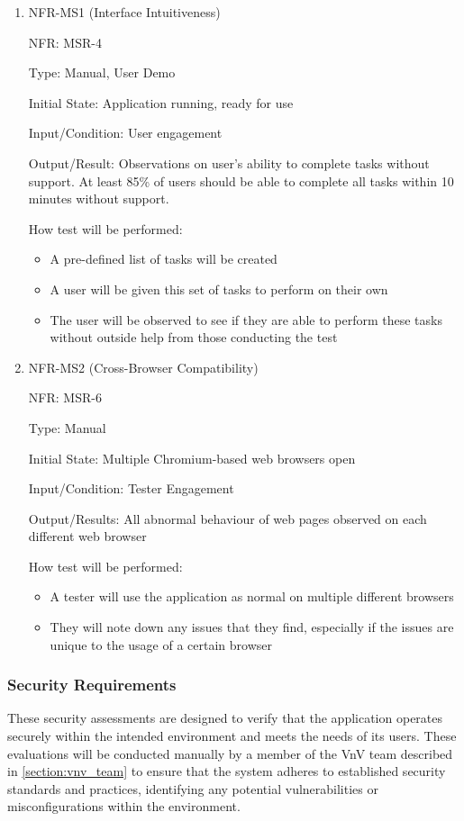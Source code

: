 \documentclass[12pt, titlepage]{article}
\begin{document}
\begin{enumerate}
\item{NFR-MS1 (Interface Intuitiveness)\\}

NFR: MSR-4 

Type: Manual, User Demo

Initial State: Application running, ready for use

Input/Condition: User engagement

Output/Result: Observations on user's ability to complete tasks without support.
At least 85\% of users should be able to complete all tasks within 10 minutes
without support.

How test will be performed: 
\begin{itemize}
  \item  A pre-defined list of tasks will be created 
  \item A user will be given this set of tasks to perform on their own
  \item The user will be observed to see if they are able to perform these tasks
  without outside help from those conducting the test 
\end{itemize}
					
\item{NFR-MS2 (Cross-Browser Compatibility)\\}

NFR: MSR-6

Type: Manual

Initial State: Multiple Chromium-based web browsers open

Input/Condition: Tester Engagement

Output/Results: All abnormal behaviour of web pages observed on each different
web browser

How test will be performed: 
\begin{itemize}
  \item A tester will use the application as normal on multiple different
  browsers
  \item They will note down any issues that they find, especially if the issues
  are unique to the usage of a certain browser
\end{itemize}
\end{enumerate}

\subsubsection{Security Requirements}
These security assessments are designed to verify that the application operates
securely within the intended environment and meets the needs of its users. These
evaluations will be conducted manually by a member of the VnV team described in
\ref{section:vnv_team} to ensure that the system adheres to established security
standards and practices, identifying any potential vulnerabilities or
misconfigurations within the environment.
\end{document}
